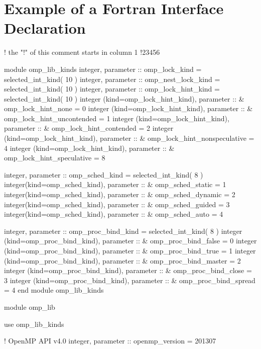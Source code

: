 \section{Example of a Fortran Interface Declaration }
\label{sec:Example of a Fortran Interface Declaration module}
{\small \begin{codepar}
!      the "!" of this comment starts in column 1
!23456

        module omp\_lib\_kinds
        integer, parameter :: omp\_lock\_kind = selected\_int\_kind( 10 )
        integer, parameter :: omp\_nest\_lock\_kind = selected\_int\_kind( 10 )
        integer, parameter :: omp\_lock\_hint\_kind = selected\_int\_kind( 10 )
        integer (kind=omp\_lock\_hint\_kind), parameter :: 
      \&   omp\_lock\_hint\_none = 0
        integer (kind=omp\_lock\_hint\_kind), parameter :: 
      \&   omp\_lock\_hint\_uncontended = 1
        integer (kind=omp\_lock\_hint\_kind), parameter :: 
      \&   omp\_lock\_hint\_contended = 2
        integer (kind=omp\_lock\_hint\_kind), parameter :: 
      \&   omp\_lock\_hint\_nonspeculative = 4 
        integer (kind=omp\_lock\_hint\_kind), parameter :: 
      \&   omp\_lock\_hint\_speculative = 8

        integer, parameter :: omp\_sched\_kind = selected\_int\_kind( 8 ) 
        integer(kind=omp\_sched\_kind), parameter ::
      \&   omp\_sched\_static = 1
        integer(kind=omp\_sched\_kind), parameter ::
      \&   omp\_sched\_dynamic = 2
        integer(kind=omp\_sched\_kind), parameter ::
      \&   omp\_sched\_guided = 3
        integer(kind=omp\_sched\_kind), parameter ::
      \&   omp\_sched\_auto = 4
      
        integer, parameter :: omp\_proc\_bind\_kind = selected\_int\_kind( 8 )
        integer (kind=omp\_proc\_bind\_kind), parameter ::
      \&   omp\_proc\_bind\_false = 0
        integer (kind=omp\_proc\_bind\_kind), parameter ::
      \&   omp\_proc\_bind\_true = 1
        integer (kind=omp\_proc\_bind\_kind), parameter ::
      \&   omp\_proc\_bind\_master = 2
        integer (kind=omp\_proc\_bind\_kind), parameter ::
      \&   omp\_proc\_bind\_close = 3
        integer (kind=omp\_proc\_bind\_kind), parameter ::
      \&   omp\_proc\_bind\_spread = 4
         end module omp\_lib\_kinds

        module omp\_lib

          use omp\_lib\_kinds

!                                     OpenMP API v4.0
          integer, parameter :: openmp\_version = 201307


\end{codepar}}
